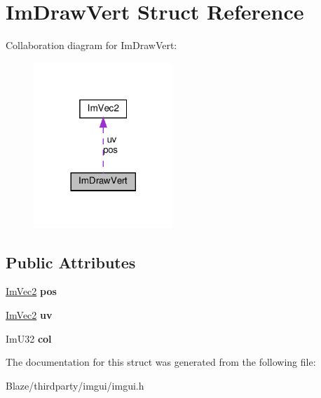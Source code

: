 \hypertarget{structImDrawVert}{}\section{Im\+Draw\+Vert Struct Reference}
\label{structImDrawVert}


Collaboration diagram for Im\+Draw\+Vert\+:\nopagebreak
\begin{figure}[H]
\begin{center}
\leavevmode
\includegraphics[width=149pt]{structImDrawVert__coll__graph}
\end{center}
\end{figure}
\subsection*{Public Attributes}
\begin{DoxyCompactItemize}
\item 
\mbox{\label{structImDrawVert_aedc578bbf364ddea71be12b4f177a5b4}} 
\hyperlink{structImVec2}{Im\+Vec2} {\bfseries pos}
\item 
\mbox{\label{structImDrawVert_abdf3183529055a6c3f709b23a4bf06b1}} 
\hyperlink{structImVec2}{Im\+Vec2} {\bfseries uv}
\item 
\mbox{\label{structImDrawVert_ab98ba53ce2690b56f5ba94682ed83940}} 
Im\+U32 {\bfseries col}
\end{DoxyCompactItemize}


The documentation for this struct was generated from the following file\+:\begin{DoxyCompactItemize}
\item 
Blaze/thirdparty/imgui/imgui.\+h\end{DoxyCompactItemize}
